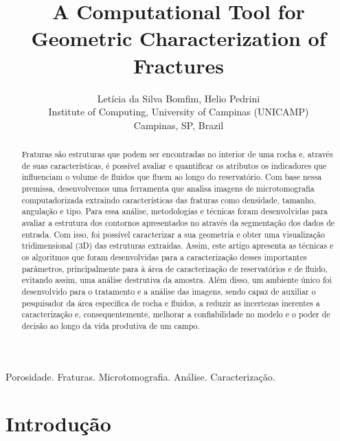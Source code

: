 \documentclass[a4paper,10pt,twocolumn,twoside]{article}
\begin{document}
\sloppy

\title{
A Computational Tool for Geometric Characterization of Fractures
}

\author{
Let\'icia da Silva Bomfim, Helio Pedrini\\
Institute of Computing, University of Campinas (UNICAMP) \\
Campinas, SP, Brazil }

\date{}

\maketitle

\begin{abstract}

\noindent Fraturas são estruturas que podem ser encontradas no interior de uma rocha  e, através de suas características, é possível avaliar e quantificar os atributos os indicadores que influenciam  o volume de fluidos que fluem ao longo do reservatório. Com base nessa premissa, desenvolvemos uma ferramenta que analisa imagens de microtomografia computadorizada extraindo características das fraturas como densidade, tamanho, angulação e tipo. Para essa análise, metodologias e técnicas foram desenvolvidas para avaliar a estrutura dos contornos apresentados no através da segmentação dos dados de entrada. Com isso, foi possível caracterizar a sua geometria e obter uma visualização tridimensional (3D) das estruturas extraídas. Assim, este artigo apresenta as técnicas e os algoritmos que foram desenvolvidas para a caracterização desses importantes parâmetros, principalmente para à área de caracterização de reservatórios e de fluido, evitando assim, uma análise destrutiva da amostra. Além disso,  um ambiente único foi desenvolvido para o tratamento e a análise das imagens, sendo capaz de auxiliar o pesquisador da área especifica de rocha e fluidos, a reduzir as incertezas inerentes a caracterização e, consequentemente, melhorar a confiabilidade no modelo e o poder de decisão ao longo da vida produtiva de um campo. 

\end{abstract}

\begin{keywords}
Porosidade. Fraturas. Microtomografia. Análise. Caracterização.
\end{keywords}

\section{Introdução}
\label{sec:introducao}
\end{document}
